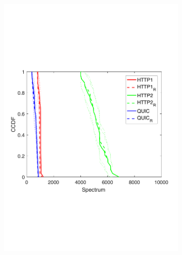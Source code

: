 \begin{figure}[t!]
\begin{subfigure}[t]{0.33\textwidth}
    \includegraphics[trim={0 7cm 0 7cm}, scale=0.25]{figures/CDF_magswitch_squad_mixed_clients_nd18.pdf}
    \caption{}
    \label{fig:pmixedmagsw}
  \end{subfigure}
    \begin{subfigure}[t]{0.33\textwidth}
  \captionsetup{justification=raggedright,singlelinecheck=false,margin=2.5cm}

\end{subfigure}
\end{figure}
